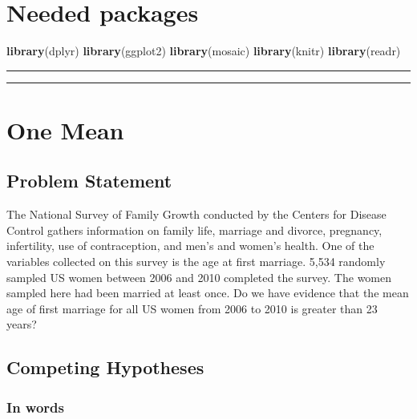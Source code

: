 \documentclass[]{tufte-book}
\newenvironment{Shaded}{\begin{snugshade}}{\end{snugshade}}
\newcommand{\KeywordTok}[1]{\textcolor[rgb]{0.13,0.29,0.53}{\textbf{{#1}}}}
\newcommand{\NormalTok}[1]{{#1}}
\let\oldrule=\rule
\renewcommand{\rule}[1]{\oldrule{\linewidth}}
\begin{document}
\section{Needed packages}\label{needed-packages-6}

\begin{Shaded}
\begin{Highlighting}[]
\KeywordTok{library}\NormalTok{(dplyr)}
\KeywordTok{library}\NormalTok{(ggplot2)}
\KeywordTok{library}\NormalTok{(mosaic)}
\KeywordTok{library}\NormalTok{(knitr)}
\KeywordTok{library}\NormalTok{(readr)}
\end{Highlighting}
\end{Shaded}

\begin{center}\rule{0.5\linewidth}{\linethickness}\end{center}

\begin{center}\rule{0.5\linewidth}{\linethickness}\end{center}

\section{One Mean}\label{one-mean}

\subsection{Problem Statement}\label{problem-statement}

The National Survey of Family Growth conducted by the Centers for
Disease Control gathers information on family life, marriage and
divorce, pregnancy, infertility, use of contraception, and men's and
women's health. One of the variables collected on this survey is the age
at first marriage. 5,534 randomly sampled US women between 2006 and 2010
completed the survey. The women sampled here had been married at least
once. Do we have evidence that the mean age of first marriage for all US
women from 2006 to 2010 is greater than 23 years? \citep[Tweaked a bit
from][ {[}Chapter 4{]}]{isrs2014}

\subsection{Competing Hypotheses}\label{competing-hypotheses}

\subsubsection{In words}\label{in-words}
\end{document}
